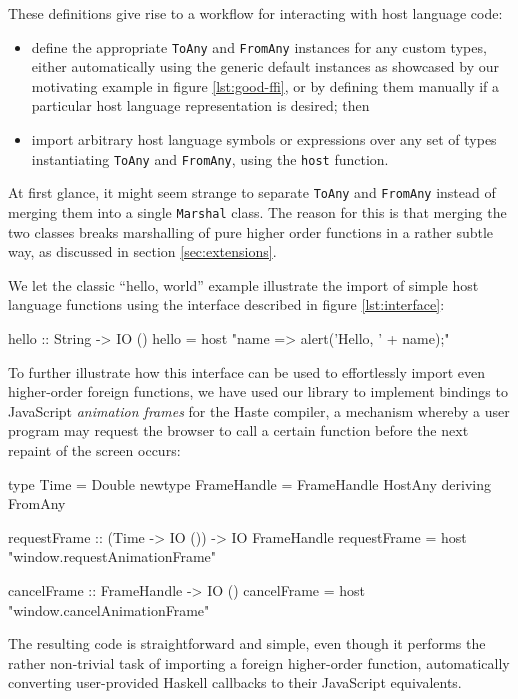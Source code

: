 \documentclass[preprint]{sigplanconf}
\begin{document}
These definitions give rise to a workflow for interacting with host
language code:
\begin{itemize}
\item
  define the appropriate \lstinline!ToAny! and \lstinline!FromAny! instances
  for any custom types, either automatically using the generic default instances
  as showcased by our motivating example in figure \ref{lst:good-ffi},
  or by defining them manually if a particular host language representation is
  desired; then
\item
  import arbitrary host language symbols or expressions over
  any set of types instantiating \lstinline!ToAny! and \lstinline!FromAny!,
  using the \lstinline!host! function.
\end{itemize}

At first glance, it might seem strange to separate \lstinline!ToAny!
and \lstinline!FromAny! instead of merging them into a single
\lstinline!Marshal! class. The reason for this is that merging the two classes
breaks marshalling of pure higher order functions in a rather subtle way, as
discussed in section \ref{sec:extensions}.

We let the classic ``hello, world'' example illustrate the import of simple
host language functions using the interface described in figure
\ref{lst:interface}:

\begin{code}
hello :: String -> IO ()
hello = host "name => alert('Hello, ' + name);"
\end{code}

To further illustrate how this interface can be used to effortlessly import
even higher-order foreign functions, we have used our library to
implement bindings to JavaScript \emph{animation frames} for the Haste
compiler, a mechanism whereby a user program may request the browser to call
a certain function before the next repaint of the screen occurs:

\begin{code}
type Time = Double
newtype FrameHandle = FrameHandle HostAny
  deriving FromAny

requestFrame :: (Time -> IO ()) -> IO FrameHandle
requestFrame = host "window.requestAnimationFrame"

cancelFrame :: FrameHandle -> IO ()
cancelFrame = host "window.cancelAnimationFrame"
\end{code}

The resulting code is straightforward and simple, even though it performs
the rather non-trivial task of importing a foreign higher-order function,
automatically converting user-provided Haskell callbacks to their JavaScript
equivalents.
\end{document}
